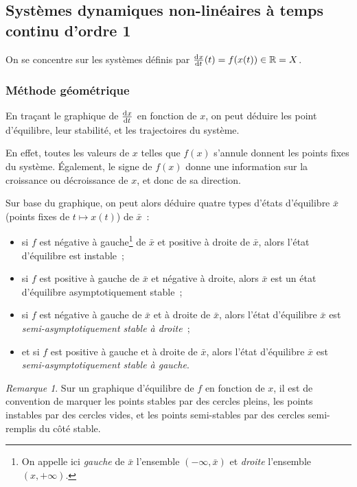 \documentclass{article}
\theoremstyle{definition}
\theoremstyle{remark}
\newtheorem*{rmq}{Remarque}
\newcommand{\R}{\mathbb R}
\begin{document}
	\subsection{Systèmes dynamiques non-linéaires à temps continu d'ordre 1}

	On se concentre sur les systèmes définis par $\od xt(t) = f(x(t)) \in \R = X$.

		\subsubsection{Méthode géométrique}

	En traçant le graphique de $\od xt$ en fonction de $x$, on peut déduire les point d'équilibre, leur stabilité, et les trajectoires du système.

	En effet, toutes les valeurs de $x$ telles que $f(x)$ s'annule donnent les points fixes du système. Également, le signe de $f(x)$ donne une information
	sur la croissance ou décroissance de $x$, et donc de sa direction.

	Sur base du graphique, on peut alors déduire quatre types d'états d'équilibre $\bar x$ (points fixes de $t \mapsto x(t)$) de $\bar x$~:
	\begin{itemize}
		\item si $f$ est négative à gauche\footnote{On appelle ici \textit{gauche} de $\bar x$ l'ensemble $(-\infty, \bar x)$ et \textit{droite} l'ensemble
		$(x, +\infty)$.} de $\bar x$ et positive à droite de $\bar x$, alors l'état d'équilibre est instable~;
		\item si $f$ est positive à gauche de $\bar x$ et négative à droite, alors $\bar x$ est un état d'équilibre asymptotiquement stable~;
		\item si $f$ est négative à gauche de $\bar x$ et à droite de $\bar x$, alors l'état d'équilibre $\bar x$ est \textit{semi-asymptotiquement stable à
		droite}~;
		\item et si $f$ est positive à gauche et à droite de $\bar x$, alors l'état d'équilibre $\bar x$ est \textit{semi-asymptotiquement stable à gauche}.
	\end{itemize}

	\begin{rmq} Sur un graphique d'équilibre de $f$ en fonction de $x$, il est de convention de marquer les points stables par des cercles pleins, les points
	instables par des cercles vides, et les points semi-stables par des cercles semi-remplis du côté stable.
	\end{rmq}
\end{document}
